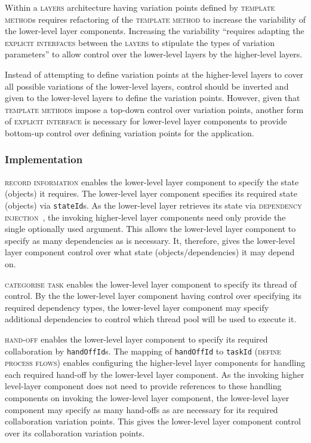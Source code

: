 \documentclass[prodmode]{style/acmlarge}
\begin{document}
Within a \textsc{layers} architecture having variation points defined by
\textsc{template method}s requires refactoring of the \textsc{template method}
to increase the variability of the lower-level layer components.  Increasing the
variability ``requires adapting the \textsc{explicit interfaces} between the
\textsc{layers} to stipulate the types of variation parameters'' \cite[p.
5]{ioc} to allow control over the lower-level layers by the higher-level layers.

Instead of attempting to define variation points at the higher-level layers to
cover all possible variations of the lower-level layers, control should be
inverted and given to the lower-level layers to define the variation points. 
However, given that \textsc{template methods} impose a top-down control over
variation points, another form of \textsc{explicit interface} is necessary for
lower-level layer components to provide bottom-up control over defining
variation points for the application.



\subsubsection*{Implementation}

\textsc{record information} enables the lower-level layer component to specify
the state (objects) it requires.  The lower-level layer component specifies its
required state (objects) via \texttt{stateId}s.  As the lower-level layer
retrieves its state via \textsc{dependency injection}~\cite{ioc}, the invoking
higher-level layer components need only provide the single optionally used
argument.  This allows the lower-level layer component to specify as many
dependencies as is necessary.  It, therefore, gives the lower-level layer
component control over what state (objects/dependencies) it may depend on.

\textsc{categorise task} enables the lower-level layer component to specify its
thread of control.  By the the lower-level layer component having control over
specifying its required dependency types, the lower-level layer component may
specify additional dependencies to control which thread pool will be used to
execute it.

\textsc{hand-off} enables the lower-level layer component to specify its
required collaboration by \texttt{handOffId}s.  The mapping of
\texttt{handOffId} to \texttt{taskId} (\textsc{define process flows}) enables
configuring the higher-level layer components for handling each required
hand-off by the lower-level layer component.  As the invoking higher level-layer
component does not need to provide references to these handling components on
invoking the lower-level layer component, the lower-level layer component may
specify as many hand-offs as are necessary for its required collaboration
variation points.  This gives the lower-level layer component control over its
collaboration variation points.
\end{document}

